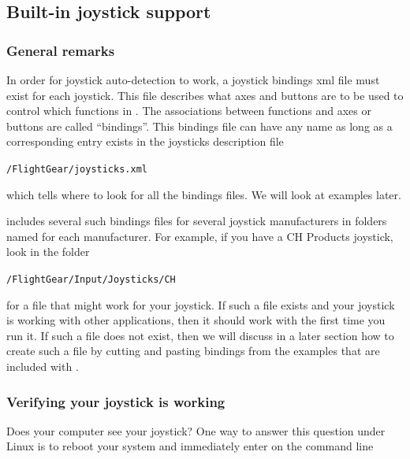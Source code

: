 \subsection{Built-in joystick support\label{joystickbuiltin}}

\subsubsection{General remarks\label{generalremarks}}
In order for joystick auto-detection to work, a joystick bindings xml file
must exist for each joystick. This file describes what axes and buttons are
to be used to control which functions in \FlightGear{}.  The associations
between functions and axes or buttons are called ``bindings''.  This
bindings file can have any name as long as a corresponding entry exists in
the joysticks description file
\medskip

     	\texttt{/FlightGear/joysticks.xml}
\medskip

\noindent
which tells \FlightGear{} where to look for all the bindings files.  We will
look at examples later.

\FlightGear{} includes several such bindings files for several joystick
manufacturers in folders named for each manufacturer.  For example, if you
have a CH Products joystick, look in the folder
\medskip

    \texttt{/FlightGear/Input/Joysticks/CH}
    \medskip

\noindent
for a file that might work for your joystick.  If such a file exists and
your joystick is working with other applications, then it should work with
\FlightGear{} the first time you run it.  If such a file does not exist,
then we will discuss in a later section how to create such a file by cutting
and pasting bindings from the examples that are included with \FlightGear{}.

\subsubsection{Verifying your joystick is working\label{verifying}}
Does your computer see your joystick?  One way to answer this question under Linux is to reboot your system and immediately enter on the command line
\medskip

